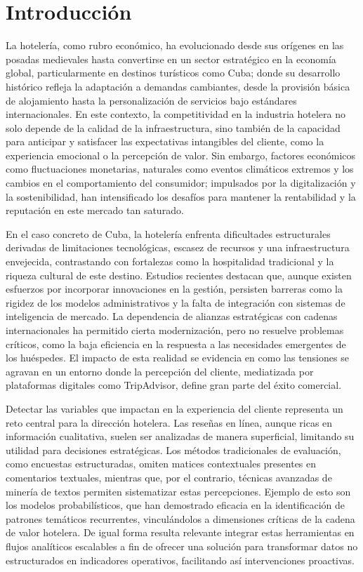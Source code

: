 \section*{Introducción}



	
	
	La hotelería, como rubro económico, ha evolucionado desde sus orígenes en las posadas medievales hasta convertirse en un sector estratégico en la economía global, particularmente en destinos turísticos como Cuba; donde su desarrollo histórico refleja la adaptación a demandas cambiantes, desde la provisión básica de alojamiento hasta la personalización de servicios bajo estándares internacionales. En este contexto, la competitividad en la industria hotelera no solo depende de la calidad de la infraestructura, sino también de la capacidad para anticipar y satisfacer las expectativas intangibles del cliente, como la experiencia emocional o la percepción de valor. Sin embargo, factores económicos como fluctuaciones monetarias, naturales como eventos climáticos extremos y los cambios en el comportamiento del consumidor; impulsados por la digitalización y la sostenibilidad, han intensificado los desafíos para mantener la rentabilidad y la reputación en este mercado tan saturado.
	
	En el caso concreto de Cuba, la hotelería enfrenta dificultades estructurales derivadas de limitaciones tecnológicas, escasez de recursos y una infraestructura envejecida, contrastando con fortalezas como la hospitalidad tradicional y la riqueza cultural de este destino. Estudios recientes destacan que, aunque existen esfuerzos por incorporar innovaciones en la gestión, persisten barreras como la rigidez de los modelos administrativos y la falta de integración con sistemas de inteligencia de mercado. La dependencia de alianzas estratégicas con cadenas internacionales ha permitido cierta modernización, pero no resuelve problemas críticos, como la baja eficiencia en la respuesta a las necesidades emergentes de los huéspedes. El impacto de esta realidad se evidencia en como las tensiones se agravan en un entorno donde la percepción del cliente, mediatizada por plataformas digitales como TripAdvisor, define gran parte del éxito comercial.
	
	Detectar las variables que impactan en la experiencia del cliente representa un reto central para la dirección hotelera. Las reseñas en línea, aunque ricas en información cualitativa, suelen ser analizadas de manera superficial, limitando su utilidad para decisiones estratégicas. Los métodos tradicionales de evaluación, como encuestas estructuradas, omiten matices contextuales presentes en comentarios textuales, mientras que, por el contrario, técnicas avanzadas de minería de textos permiten sistematizar estas percepciones. Ejemplo de esto son los modelos probabilísticos, que han demostrado eficacia en la identificación de patrones temáticos recurrentes, vinculándolos a dimensiones críticas de la cadena de valor hotelera. De igual forma resulta relevante integrar estas herramientas en flujos analíticos escalables a fin de ofrecer una solución para transformar datos no estructurados en indicadores operativos, facilitando así intervenciones proactivas.
	
